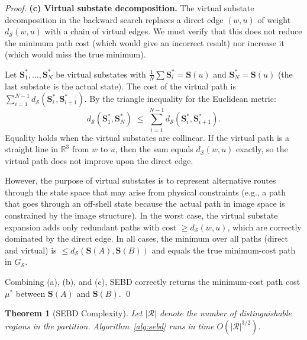 \documentclass[twocolumn]{article}
\theoremstyle{plain}
\newtheorem{theorem}{Theorem}[section]
\theoremstyle{definition}
\newcommand{\ScS}{\mathcal{S}}
\newcommand{\bS}{\mathbf{S}}
\newcommand{\dS}{d_{\mathcal{S}}}
\newcommand{\reals}{\mathbb{R}}
\begin{document}
\begin{proof}
\textbf{(c) Virtual substate decomposition.} The virtual substate decomposition
in the backward search replaces a direct edge $(w,u)$ of weight $\dS(w,u)$ with
a chain of virtual edges. We must verify that this does not reduce the minimum
path cost (which would give an incorrect result) nor increase it (which would
miss the true minimum).

Let $\bS_1^*, \ldots, \bS_N^*$ be virtual substates with $\frac{1}{N}\sum \bS_i^* = \bS(u)$
and $\bS_N^* = \bS(u)$ (the last substate is the actual state). The cost of
the virtual path is $\sum_{i=1}^{N-1} \dS(\bS_i^*, \bS_{i+1}^*)$. By the
triangle inequality for the Euclidean metric:
\[
  \dS(\bS_1^*, \bS_N^*) \;\leq\; \sum_{i=1}^{N-1} \dS(\bS_i^*, \bS_{i+1}^*).
\]
Equality holds when the virtual substates are collinear. If the virtual path is
a straight line in $\reals^3$ from $w$ to $u$, then the sum equals $\dS(w, u)$
exactly, so the virtual path does not improve upon the direct edge.

However, the purpose of virtual substates is to represent alternative routes
through the state space that may arise from physical constraints (e.g., a path
that goes through an off-shell state because the actual path in image space
is constrained by the image structure). In the worst case, the virtual substate
expansion adds only redundant paths with cost $\geq \dS(w,u)$, which are
correctly dominated by the direct edge. In all cases, the minimum over all
paths (direct and virtual) is $\leq \dS(\bS(A), \bS(B))$ and equals the true
minimum-cost path in $G_\ScS$.

Combining (a), (b), and (c), SEBD correctly returns the minimum-cost path cost
$\mu^*$ between $\bS(A)$ and $\bS(B)$. \qed
\end{proof}

\begin{theorem}[SEBD Complexity]
\label{thm:complexity}
Let $|\mathcal{R}|$ denote the number of distinguishable regions in the partition.
Algorithm~\ref{alg:sebd} runs in time $O(|\mathcal{R}|^{3/2})$.
\end{theorem}
\end{document}
